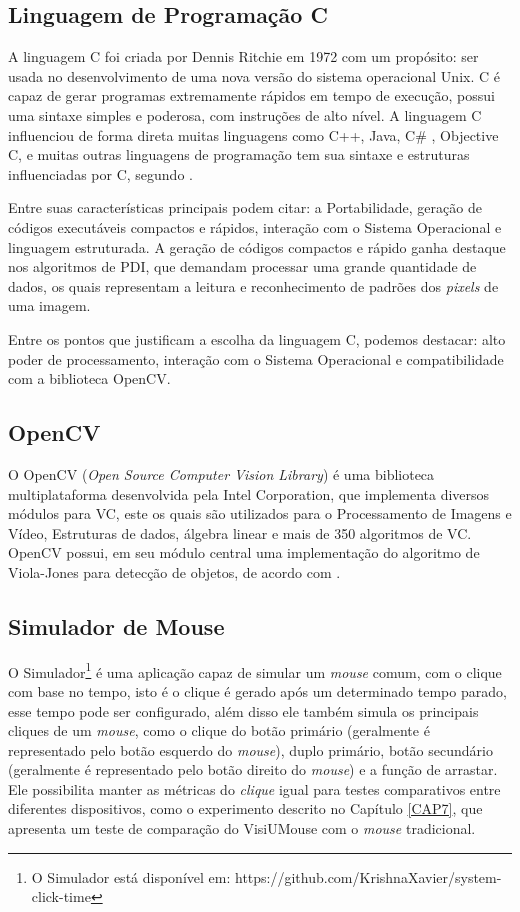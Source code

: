\subsection{Linguagem de Programação C}

A linguagem C foi criada por Dennis Ritchie em 1972 com um propósito: ser usada no desenvolvimento de uma nova versão do sistema operacional Unix. C é capaz de gerar programas extremamente rápidos em tempo de execução, possui uma sintaxe simples e poderosa, com instruções de alto nível. A linguagem C influenciou de forma direta muitas linguagens como C++, Java, C\# , Objective C, e muitas outras linguagens de programação tem sua sintaxe e estruturas influenciadas por C, segundo .

Entre suas características principais podem citar: a Portabilidade, geração de códigos executáveis compactos e rápidos, interação com o Sistema Operacional e linguagem estruturada. A geração de códigos compactos e rápido ganha destaque nos algoritmos de PDI, que demandam processar uma grande quantidade de dados, os quais representam a leitura e reconhecimento de padrões dos \textit{pixels} de uma imagem.

Entre os pontos que justificam a escolha da linguagem C, podemos destacar: alto poder de processamento, interação com o Sistema Operacional e compatibilidade com a biblioteca OpenCV.

\subsection{OpenCV}

O OpenCV (\textit{Open Source Computer Vision Library}) é uma biblioteca multiplataforma desenvolvida pela Intel Corporation, que implementa diversos módulos para VC, este os quais são utilizados para o Processamento de Imagens e Vídeo, Estruturas de dados, álgebra linear e mais de 350 algoritmos de VC. OpenCV possui, em seu módulo central uma implementação do algoritmo de Viola-Jones para detecção de objetos, de acordo com \cite{bradski2008learning}.

\subsection{Simulador de Mouse}

O Simulador\footnote{O Simulador está disponível em: https://github.com/KrishnaXavier/system-click-time} é uma aplicação capaz de simular um \textit{mouse} comum, com o clique com base no tempo, isto é o clique é gerado após um determinado tempo parado, esse tempo pode ser configurado, além disso ele também simula os principais cliques de um \textit{mouse}, como o clique do botão primário (geralmente é representado pelo botão esquerdo do \textit{mouse}), duplo primário, botão secundário (geralmente é representado pelo botão direito do \textit{mouse}) e a função de arrastar. Ele possibilita manter as métricas do \textit{clique} igual para testes comparativos entre diferentes dispositivos, como o experimento descrito no Capítulo \ref{CAP7}, que apresenta um teste de comparação do VisiUMouse com o \textit{mouse} tradicional.


